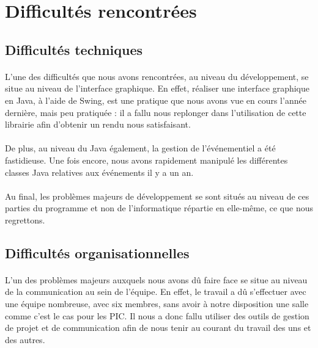\section{Difficultés rencontrées}

\subsection{Difficultés techniques}

\paragraph{}
L'une des difficultés que nous avons rencontrées, au niveau du développement, se situe au niveau de l'interface graphique. En effet, réaliser une interface graphique en Java, à l'aide de Swing, est une pratique que nous avons vue en cours l'année dernière, mais peu pratiquée : il a fallu nous replonger dans l'utilisation de cette librairie afin d'obtenir un rendu nous satisfaisant.

\paragraph{}
De plus, au niveau du Java également, la gestion de l'événementiel a été fastidieuse. Une fois encore, nous avons rapidement manipulé les différentes classes Java relatives aux événements il y a un an.

\paragraph{}
Au final, les problèmes majeurs de développement se sont situés au niveau de ces parties du programme et non de l'informatique répartie en elle-même, ce que nous regrettons.

\subsection{Difficultés organisationnelles}

\paragraph{}
L'un des problèmes majeurs auxquels nous avons dû faire face se situe au niveau de la communication au sein de l'équipe. En effet, le travail a dû s'effectuer avec une équipe nombreuse, avec six membres, sans avoir à notre disposition une salle comme c'est le cas pour les PIC. Il nous a donc fallu utiliser des outils de gestion de projet et de communication afin de nous tenir au courant du travail des uns et des autres.

